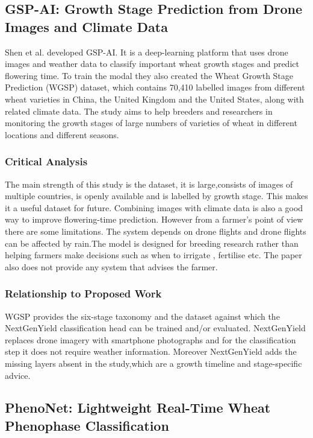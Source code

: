 \documentclass{FastFyp}
\begin{document}
\subsection{GSP-AI: Growth Stage Prediction from Drone Images and Climate Data}

Shen et al. \cite{ref:Shen:2024} developed GSP-AI. It is a deep-learning platform that uses drone images and weather  data to classify important wheat growth stages and predict flowering time. To train the modal they also created the Wheat Growth Stage Prediction (WGSP) dataset, which contains 70,410 labelled images from different wheat varieties in China, the United Kingdom and the United States, along with related climate data. The study aims to help breeders and researchers in monitoring the growth stages of large numbers of varieties of wheat in different locations and different seasons.

\subsubsection{Critical Analysis}
The main strength of this study is the dataset, it is large,consists of images of multiple countries, is openly available and is labelled by growth stage. This makes it a useful dataset for future. Combining images with climate data is also a good way to improve flowering-time prediction. However from a farmer’s point of view there are some limitations. The system depends on drone flights and drone flights can be affected by rain\cite{ref:Shen:2024}.The model is designed for breeding research rather than helping farmers make decisions such as when to irrigate , fertilise etc. The paper also does not provide any system that advises the farmer.

\subsubsection{Relationship to Proposed Work}
WGSP provides the six-stage taxonomy and the dataset against which the NextGenYield classification head can be trained and/or evaluated. NextGenYield replaces drone imagery with smartphone photographs and for the classification step it does not require weather information. Moreover NextGenYield adds the missing layers absent in the study,which are a growth timeline and stage-specific advice.


\subsection{PhenoNet: Lightweight Real-Time Wheat Phenophase Classification}
\end{document}
